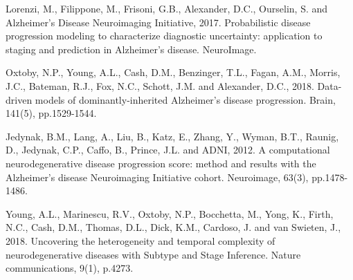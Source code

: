 \documentclass{llncs}
\begin{document}
%


\begin{thebibliography}{5}

Lorenzi, M., Filippone, M., Frisoni, G.B., Alexander, D.C., Ourselin, S. and Alzheimer's Disease Neuroimaging Initiative, 2017. Probabilistic disease progression modeling to characterize diagnostic uncertainty: application to staging and prediction in Alzheimer's disease. NeuroImage.


Oxtoby, N.P., Young, A.L., Cash, D.M., Benzinger, T.L., Fagan, A.M., Morris, J.C., Bateman, R.J., Fox, N.C., Schott, J.M. and Alexander, D.C., 2018. Data-driven models of dominantly-inherited Alzheimer’s disease progression. Brain, 141(5), pp.1529-1544.

Jedynak, B.M., Lang, A., Liu, B., Katz, E., Zhang, Y., Wyman, B.T., Raunig, D., Jedynak, C.P., Caffo, B., Prince, J.L. and ADNI, 2012. A computational neurodegenerative disease progression score: method and results with the Alzheimer's disease Neuroimaging Initiative cohort. Neuroimage, 63(3), pp.1478-1486.





Young, A.L., Marinescu, R.V., Oxtoby, N.P., Bocchetta, M., Yong, K., Firth, N.C., Cash, D.M., Thomas, D.L., Dick, K.M., Cardoso, J. and van Swieten, J., 2018. Uncovering the heterogeneity and temporal complexity of neurodegenerative diseases with Subtype and Stage Inference. Nature communications, 9(1), p.4273.




\end{thebibliography}
\end{document}
